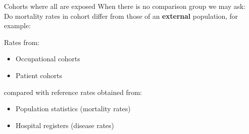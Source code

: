 \begin{frame}{Cohorts where all are exposed}
When there is no comparison group we may ask:\\
Do mortality rates in cohort differ from those of an
\textbf{external} population, for example:

\pause
Rates from:
\begin{itemize}
\item Occupational cohorts
\item Patient cohorts
\end{itemize}
\pause
compared with reference rates obtained from:
\begin{itemize}
\item Population statistics (mortality rates)
\item Hospital registers (disease rates)
\end{itemize}
\end{frame}


